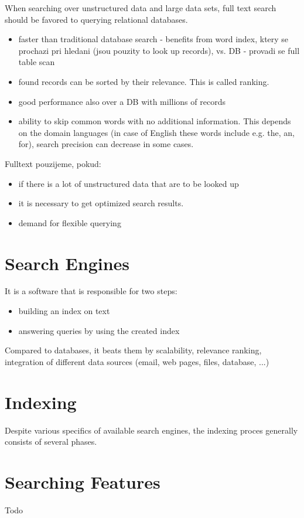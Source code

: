 When searching over unstructured data and large data sets, full text
search should be favored to querying relational databases.
\begin{itemize}
\item faster than traditional database search - benefits from word index,
ktery se prochazi pri hledani (jsou pouzity to look up records),
vs. DB - provadi se full table scan
\item found records can be sorted by their relevance. This is called ranking.
\item good performance also over a DB with millions of records
\item ability to skip common words with no additional information. This
depends on the domain languages (in case of English these words include
e.g. the, an, for), search precision can decrease in some cases. 
\end{itemize}
Fulltext pouzijeme, pokud:
\begin{itemize}
\item if there is a lot of unstructured data that are to be looked up
\item it is necessary to get optimized search results.
\item demand for flexible querying
\end{itemize}

\section{Search Engines}

It is a software that is responsible for two steps:
\begin{itemize}
\item building an index on text
\item answering queries by using the created index
\end{itemize}
Compared to databases, it beats them by scalability, relevance ranking,
integration of different data sources (email, web pages, files, database,
...)


\section{Indexing}

Despite various specifics of available search engines, the indexing proces generally consists of several phases.
\cite{Fox:1991:FFA:903195}


\section{Searching Features}

Todo
